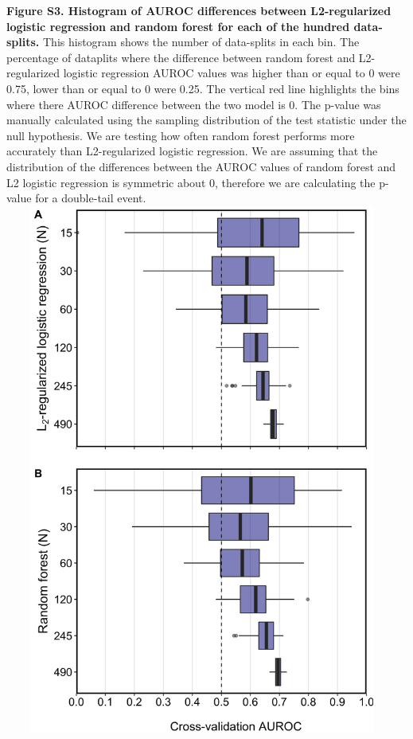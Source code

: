 \documentclass[11pt,]{article}
\begin{document}
\textbf{Figure S3. Histogram of AUROC differences between L2-regularized
logistic regression and random forest for each of the hundred
data-splits.} This histogram shows the number of data-splits in each
bin. The percentage of dataplits where the difference between random
forest and L2-regularized logistic regression AUROC values was higher
than or equal to 0 were 0.75, lower than or equal to 0 were 0.25. The
vertical red line highlights the bins where there AUROC difference
between the two model is 0. The p-value was manually calculated using
the sampling distribution of the test statistic under the null
hypothesis. We are testing how often random forest performs more
accurately than L2-regularized logistic regression. We are assuming that
the distribution of the differences between the AUROC values of random
forest and L2 logistic regression is symmetric about 0, therefore we are
calculating the p-value for a double-tail event. \newpage
\includegraphics[height=17.5cm, width=13cm]{Figure_S4.png}
\end{document}
